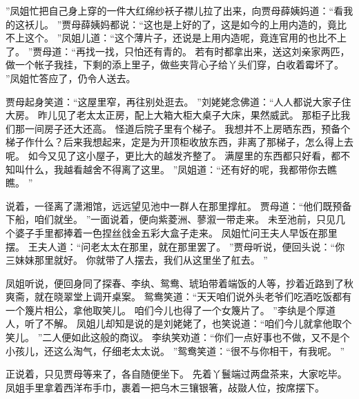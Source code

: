 ”凤姐忙把自己身上穿的一件大红绵纱袄子襟儿拉了出来，向贾母薛姨妈道：“看我的这袄儿。
”贾母薛姨妈都说：“这也是上好的了，这是如今的上用内造的，竟比不上这个。
”凤姐儿道：“这个薄片子，还说是上用内造呢，竟连官用的也比不上了。
”贾母道：“再找一找，只怕还有青的。
若有时都拿出来，送这刘亲家两匹，做一个帐子我挂，下剩的添上里子，做些夹背心子给丫头们穿，白收着霉坏了。
”凤姐忙答应了，仍令人送去。
\par
贾母起身笑道：“这屋里窄，再往别处逛去。
”刘姥姥念佛道：“人人都说大家子住大房。
昨儿见了老太太正房，配上大箱大柜大桌子大床，果然威武。
那柜子比我们那一间房子还大还高。
怪道后院子里有个梯子。
我想并不上房晒东西，预备个梯子作什么？后来我想起来，定是为开顶柜收放东西，非离了那梯子，怎么得上去呢。
如今又见了这小屋子，更比大的越发齐整了。
满屋里的东西都只好看，都不知叫什么，我越看越舍不得离了这里。
”凤姐道：“还有好的呢，我都带你去瞧瞧。
”\par
说着，一径离了潇湘馆，远远望见池中一群人在那里撑舡。
贾母道：“他们既预备下船，咱们就坐。
”一面说着，便向紫菱洲、蓼溆一带走来。
未至池前，只见几个婆子手里都捧着一色捏丝戗金五彩大盒子走来。
凤姐忙问王夫人早饭在那里摆。
王夫人道：“问老太太在那里，就在那里罢了。
”贾母听说，便回头说：“你三妹妹那里就好。
你就带了人摆去，我们从这里坐了舡去。
”\par
凤姐听说，便回身同了探春、李纨、鸳鸯、琥珀带着端饭的人等，抄着近路到了秋爽斋，就在晓翠堂上调开桌案。
鸳鸯笑道：“天天咱们说外头老爷们吃酒吃饭都有一个篾片相公，拿他取笑儿。
咱们今儿也得了一个女篾片了。
”李纨是个厚道人，听了不解。
凤姐儿却知是说的是刘姥姥了，也笑说道：“咱们今儿就拿他取个笑儿。
”二人便如此这般的商议。
李纨笑劝道：“你们一点好事也不做，又不是个小孩儿，还这么淘气，仔细老太太说。
”鸳鸯笑道：“很不与你相干，有我呢。
”\par
正说着，只见贾母等来了，各自随便坐下。
先着丫鬟端过两盘茶来，大家吃毕。
凤姐手里拿着西洋布手巾，裹着一把乌木三镶银箸，敁敠人位，按席摆下。
